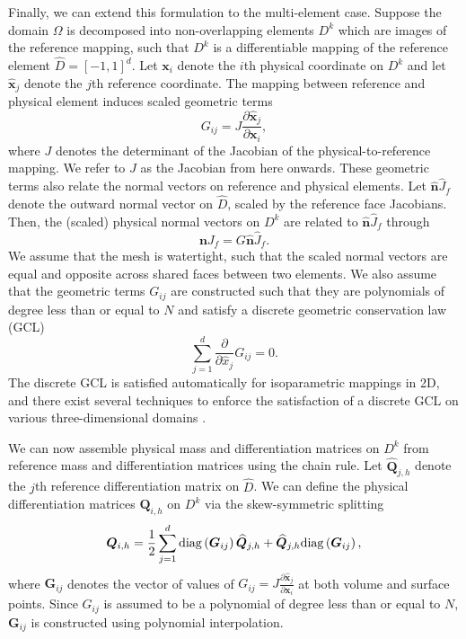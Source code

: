 \documentclass{svjour3}                     %
\renewcommand{\hat}{\widehat}
\newcommand{\diag}[1]{{\rm diag}\LRp{#1}}
\newcommand{\pd}[2]{\frac{\partial#1}{\partial#2}}
\newcommand{\LRp}[1]{\left( #1 \right)}
\begin{document}
Finally, we can extend this formulation to the multi-element case.  Suppose the domain $\Omega$ is decomposed into non-overlapping elements $D^k$ which are images of the reference mapping, such that $D^k$ is a differentiable mapping of the reference element $\hat{D} = [-1,1]^d$.  Let $\bm{x}_i$ denote the $i$th physical coordinate on $D^k$ and let $\hat{\bm{x}}_j$ denote the $j$th reference coordinate.  The mapping between reference and physical element induces scaled geometric terms 
\[
G_{ij} = J\pd{\hat{\bm{x}}_j}{\bm{x}_i},
\]
where $J$ denotes the determinant of the Jacobian of the physical-to-reference mapping.  We refer to $J$ as the Jacobian from here onwards.
These geometric terms also relate the normal vectors on reference and physical elements.  Let $\hat{\bm{n}}\hat{J}_f$ denote the outward normal vector on $\hat{D}$, scaled by the reference face Jacobians.  Then, the (scaled) physical normal vectors on $D^k$ are related to $\hat{\bm{n}}\hat{J}_f$ through
\begin{equation}
\bm{n}J_f = G\hat{\bm{n}}\hat{J}_f.
\label{eq:nJ_Gnhat}
\end{equation}
We assume that the mesh is watertight, such that the scaled normal vectors are equal and opposite across shared faces between two elements.  We also assume that the geometric terms ${G}_{ij}$ are constructed such that they are polynomials of degree less than or equal to $N$ and satisfy a discrete geometric conservation law (GCL)
\begin{equation}
\sum_{j=1}^d \pd{}{\hat{x}_j} G_{ij} = 0.
\label{eq:dgcl}
\end{equation}
The discrete GCL is satisfied automatically for isoparametric mappings in 2D, and there exist several techniques to enforce the satisfaction of a discrete GCL on various three-dimensional domains \cite{thomas1979geometric, kopriva2006metric, crean2018entropy, chan2018discretely, kozdon2018energy, kopriva2019free}.  

We can now assemble physical mass and differentiation matrices on $D^k$ from reference mass and differentiation matrices using the chain rule.  Let $\hat{\bm{Q}}_{j,h}$ denote the $j$th reference differentiation matrix on $\hat{D}$.  We can define the physical differentiation matrices $\bm{Q}_{i,h}$ on $D^k$ via the skew-symmetric splitting
\begin{equation}
\bm{Q}_{i,h} = \frac{1}{2}\sum_{j=1}^d \diag{\bm{G}_{ij}}\hat{\bm{Q}}_{j,h} + \hat{\bm{Q}}_{j,h} \diag{\bm{G}_{ij}},
\label{eq:curvedQ}
\end{equation}
where $\bm{G}_{ij}$ denotes the vector of values of $G_{ij} = J\pd{\hat{\bm{x}}_j}{\bm{x}_i}$ at both volume and surface points.  Since $G_{ij}$ is assumed to be a polynomial of degree less than or equal to $N$, $\bm{G}_{ij}$ is constructed using polynomial interpolation.
\end{document}
